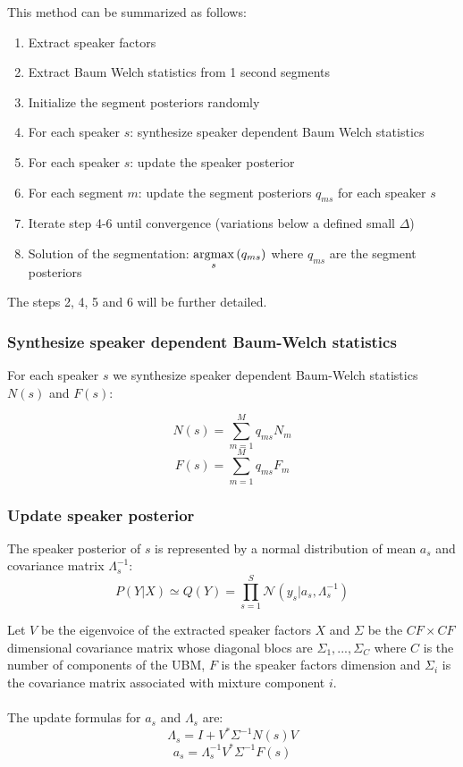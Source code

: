 \documentclass{techrep} %
\begin{document}
This method can be summarized as follows:
\begin{enumerate}
\item Extract speaker factors
\item Extract Baum Welch statistics from 1 second segments %
\item Initialize the segment posteriors randomly
\item For each speaker $s$: synthesize speaker dependent Baum Welch statistics
\item For each speaker $s$: update the speaker posterior
\item For each segment $m$: update the segment posteriors $q_{ms}$ for each
  speaker $s$
\item Iterate step 4-6 until convergence (variations below a defined small $\Delta$)
\item Solution of the segmentation: $\smash{\mathop{{\rm argmax}}\limits_{s}}\, (q_{ms})$ where $q_{ms}$ are the segment posteriors
\end{enumerate}

The steps 2, 4, 5 and 6 will be further detailed.


\subsubsection{Synthesize speaker dependent Baum-Welch statistics}

For each speaker $s$ we synthesize speaker dependent Baum-Welch statistics $N(s)$ and $F(s)$:

$$N(s) = \sum_{m=1}^{M}{q_{ms}N_m}$$
$$F(s) = \sum_{m=1}^{M}{q_{ms}F_m}$$

\subsubsection{Update speaker posterior}
The speaker posterior of $s$ is represented by a normal distribution
of mean $a_s$ and covariance matrix $\Lambda_s^{-1}$:
$$P(Y|X) \simeq Q(Y) = \prod_{s=1}^{S}\mathcal{N}(y_s|a_s,\Lambda_s^{-1})$$

Let $V$ be the eigenvoice of the extracted speaker factors $X$ and
$\Sigma$ be the $CF \times CF$ dimensional covariance matrix whose
diagonal blocs are $\Sigma_1, ..., \Sigma_C$ where $C$ is the number
of components of the UBM, $F$ is the speaker factors dimension and
$\Sigma_i$ is the covariance matrix associated with mixture component
$i$.\\\\ The update formulas for $a_s$ and $\Lambda_s$ are:
$$\Lambda_s = I + V^*\Sigma^{-1}N(s)V$$
$$a_s = \Lambda_s^{-1}V^*\Sigma^{-1}F(s)$$
\end{document}
